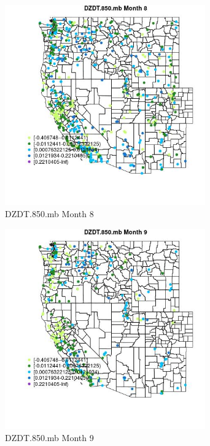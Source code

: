 \begin{figure} 
\centering  
\includegraphics[width=0.77\textwidth]{Code_Outputs/Report_ML_input_PM25_Step4_part_e_de_duplicated_aves_compiled_2019-05-18wNAs_MapObsMo8DZDT850mb.jpg} 
\caption{\label{fig:Report_ML_input_PM25_Step4_part_e_de_duplicated_aves_compiled_2019-05-18wNAsMapObsMo8DZDT850mb}DZDT.850.mb Month 8} 
\end{figure} 
 

\begin{figure} 
\centering  
\includegraphics[width=0.77\textwidth]{Code_Outputs/Report_ML_input_PM25_Step4_part_e_de_duplicated_aves_compiled_2019-05-18wNAs_MapObsMo9DZDT850mb.jpg} 
\caption{\label{fig:Report_ML_input_PM25_Step4_part_e_de_duplicated_aves_compiled_2019-05-18wNAsMapObsMo9DZDT850mb}DZDT.850.mb Month 9} 
\end{figure} 
 

